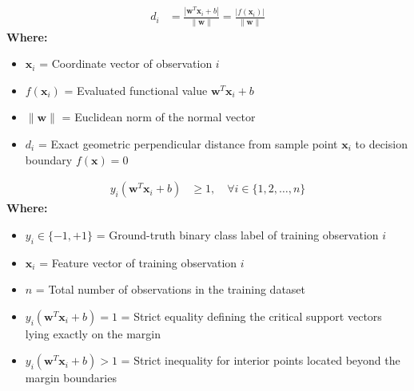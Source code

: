 \begin{formulabox}
\begin{align*}
    d_i &= \frac{|\mathbf{w}^T \mathbf{x}_i + b|}{\|\mathbf{w}\|} = \frac{|f(\mathbf{x}_i)|}{\|\mathbf{w}\|}
\end{align*}
\textbf{Where:}
\begin{itemize}[noitemsep, topsep=1pt]
    \item $\mathbf{x}_i$ = Coordinate vector of observation $i$
    \item $f(\mathbf{x}_i)$ = Evaluated functional value $\mathbf{w}^T \mathbf{x}_i + b$
    \item $\|\mathbf{w}\|$ = Euclidean norm of the normal vector
    \item $d_i$ = Exact geometric perpendicular distance from sample point $\mathbf{x}_i$ to decision boundary $f(\mathbf{x}) = 0$
\end{itemize}
\end{formulabox}

\begin{formulabox}
\begin{align*}
    y_i (\mathbf{w}^T \mathbf{x}_i + b) &\ge 1, \quad \forall i \in \{1, 2, \dots, n\}
\end{align*}
\textbf{Where:}
\begin{itemize}[noitemsep, topsep=1pt]
    \item $y_i \in \{-1, +1\}$ = Ground-truth binary class label of training observation $i$
    \item $\mathbf{x}_i$ = Feature vector of training observation $i$
    \item $n$ = Total number of observations in the training dataset
    \item $y_i (\mathbf{w}^T \mathbf{x}_i + b) = 1$ = Strict equality defining the critical support vectors lying exactly on the margin
    \item $y_i (\mathbf{w}^T \mathbf{x}_i + b) > 1$ = Strict inequality for interior points located beyond the margin boundaries
\end{itemize}
\end{formulabox}

